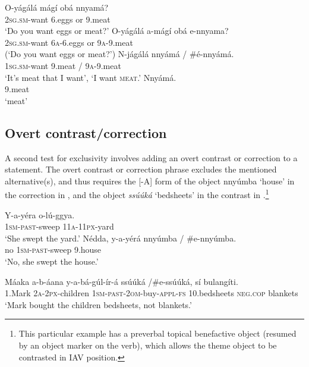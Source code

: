 \documentclass[output=paper]{langsci/langscibook}
\begin{document}
\ea\label{ex:vanderwal:26}
\ea\label{ex:vanderwal:26a}
\gll    O-yágálá    mágí    obá  nnyamá?\\
         \textsc{2sg}.\textsc{sm}-want    6.eggs    or  9.meat \\
\glt     ‘Do you want eggs or meat?’
\ex\label{ex:vanderwal:26b}
\gll    *O-yágálá    a-mágí  obá  e-nnyama?\\
         \textsc{2sg}.\textsc{sm}-want    \textsc{6a}-6.eggs  or  \textsc{9a}-9.meat\\
\glt     (‘Do you want eggs or meat?’)
\ex\label{ex:vanderwal:26c}
\gll      N-jágálá    nnyámá / \#é-nnyámá.\\
         \textsc{1sg}.\textsc{sm}-want    9.meat / \textsc{9a}-9.meat\\
\glt     ‘It’s meat that I want’, ‘I want \textsc{meat}.’
\ex\label{ex:vanderwal:26d}
\gll     Nnyámá.\\
         9.meat\\
\glt     ‘meat’
\z
\z

\subsection{Overt contrast/correction}\label{sec:vanderwal:4.2} %

A second test for exclusivity involves adding an overt contrast or correction to a statement. The overt contrast or correction phrase excludes the mentioned alternative(s), and thus requires the [-A] form of the object nnyúmba ‘house’ in the correction in , and the object \textit{ssúúká} ‘bedsheets’ in the contrast in .\footnote{This particular example has a preverbal topical benefactive object (resumed by an object marker on the verb), which allows the theme object to be contrasted in IAV position.}

\ea\label{ex:vanderwal:27}
\ea\label{ex:vanderwal:27a}
\gll      Y-a-yéra    o-lú-ggya.\\
         \textsc{1sm}-\textsc{past}-sweep  \textsc{11a}-\textsc{11px}-yard\\
\glt     ‘She swept the yard.’
\ex\label{ex:vanderwal:27b}
\gll     Nédda,  y-a-yérá    nnyúmba / \#e-nnyúmba.\\
         no    \textsc{1sm}-\textsc{past}-sweep 9.house\\
\glt     ‘No, she swept the house.’
\z
\z

\ea\label{ex:vanderwal:28}
\gll   Máaka  a-b-áana    y-a-bá-gúl-ír-á        ssúúká /\#e-ssúúká,  sí    bulangíti.\\
       1.Mark  \textsc{2a}-\textsc{2px}-children  \textsc{1sm}-\textsc{past}-\textsc{2om}-buy-\textsc{appl}-\textsc{fs}  10.bedsheets     \textsc{neg}.\textsc{cop}  blankets\\
    ‘Mark bought the children bedsheets, not blankets.’
\z
\end{document}
